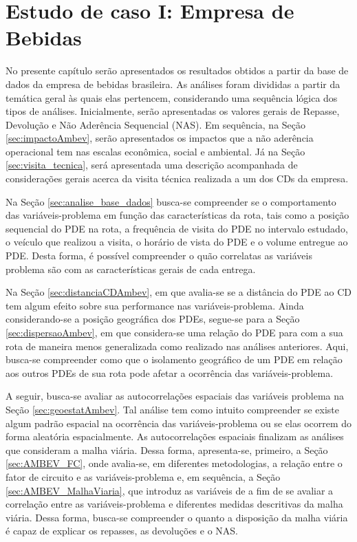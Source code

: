 \chapter{Estudo de caso I: Empresa de Bebidas} \label{sec:EstCasoAmbev}

No presente capítulo serão apresentados os resultados obtidos a partir da base de dados da empresa de bebidas brasileira.
As análises foram divididas a partir da temática geral às quais elas pertencem, considerando uma sequência lógica dos tipos de análises.
Inicialmente, serão apresentadas os valores gerais de Repasse, Devolução e Não Aderência Sequencial (NAS).
Em sequência, na Seção \ref{sec:impactoAmbev}, serão apresentados os impactos que a não aderência operacional tem nas escalas econômica, social e ambiental.
Já na Seção \ref{sec:visita_tecnica}, será apresentada uma descrição acompanhada de considerações gerais acerca da visita técnica realizada a um dos CDs da empresa.

Na Seção \ref{sec:analise_base_dados} busca-se compreender se o comportamento das variáveis-problema em função das características da rota, tais como a posição sequencial do PDE na rota, a frequência de visita do PDE no intervalo estudado, o veículo que realizou a visita, o horário de vista do PDE e o volume entregue ao PDE.
Desta forma, é possível compreender o quão correlatas as variáveis problema são com as características gerais de cada entrega.

Na Seção \ref{sec:distanciaCDAmbev}, em que avalia-se se a distância do PDE ao CD tem algum efeito sobre sua performance nas variáveis-problema.
Ainda considerando-se a posição geográfica dos PDEs, segue-se para a Seção \ref{sec:dispersaoAmbev}, em que considera-se uma relação do PDE para com a sua rota de maneira menos generalizada como realizado nas análises anteriores.
Aqui, busca-se compreender como que o isolamento geográfico de um PDE em relação aos outros PDEs de sua rota pode afetar a ocorrência das variáveis-problema.

A seguir, busca-se avaliar as autocorrelações espaciais das variáveis problema na Seção \ref{sec:geoestatAmbev}.
Tal análise tem como intuito compreender se existe algum padrão espacial na ocorrência das variáveis-problema ou se elas ocorrem do forma aleatória espacialmente. 
As autocorrelações espaciais finalizam as análises que consideram a malha viária. 
Dessa forma, apresenta-se, primeiro, a Seção \ref{sec:AMBEV_FC}, onde avalia-se, em diferentes metodologias, a relação entre o fator de circuito e as variáveis-problema e, em sequência, a Seção \ref{sec:AMBEV_MalhaViaria}, que introduz as variáveis de  a fim de se avaliar a correlação entre as variáveis-problema e diferentes medidas descritivas da malha viária.
Dessa forma, busca-se compreender o quanto a disposição da malha viária é capaz de explicar os repasses, as devoluções e o NAS.

